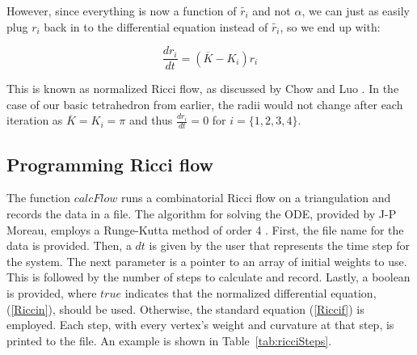 \documentclass[12pt]{article}
\begin{document}
 However, since everything is now a function of $\tilde{r_i}$ and not $\alpha$, we can just as easily plug $r_i$ back in to the differential equation instead of $\tilde{r_i}$, so we end up with:

\begin{equation}
\label{Riccin}
\frac{dr_i}{dt} = (\overline{K} - K_i)r_i
\end{equation}

 This is known as normalized Ricci flow, as discussed by Chow and Luo \cite{chowluo}. In the case of our basic tetrahedron from earlier, the radii would not change after each iteration as $\overline{K} = K_i = \pi$ and thus $\displaystyle\frac{dr_i}{dt} = 0$ for $i = \{1,2,3,4\}$. 

\subsection{Programming Ricci flow}

 The function $calcFlow$ runs a combinatorial Ricci flow on a triangulation and records the data in a file. The algorithm for solving the ODE, provided by J-P Moreau, employs a Runge-Kutta method of order 4 \cite{JPM}. First, the file name for the data is provided. Then, a $dt$ is given by the user that represents the time step for the system. The next parameter is a pointer to an array of initial weights to use. This is followed by the number of steps to calculate and record. Lastly, a boolean is provided, where $true$ indicates that the normalized differential equation, (\ref{Riccin}), should be used. Otherwise, the standard equation (\ref{Riccif}) is employed. Each step, with every vertex's weight and curvature at that step, is printed to the file. An example is shown in Table~\ref{tab:ricciSteps}.
\end{document}
